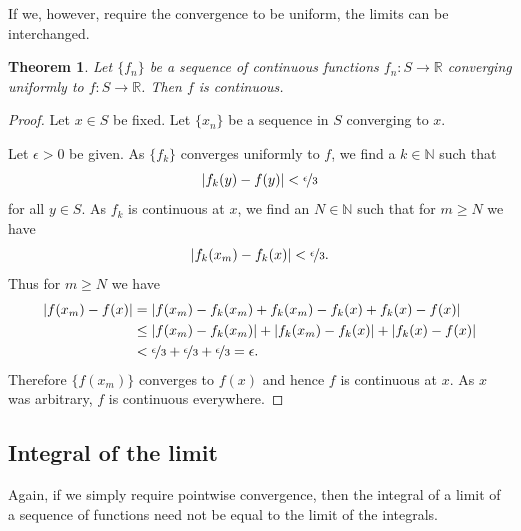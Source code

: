 \documentclass[12pt]{book}
\newcommand{\abs}[1]{\left\lvert {#1} \right\rvert}
\newcommand{\R}{{\mathbb{R}}}
\newcommand{\N}{{\mathbb{N}}}
\theoremstyle{plain}
\newtheorem{thm}{Theorem}[section]
\theoremstyle{remark}
\theoremstyle{definition}
\theoremstyle{exercise}
\theoremstyle{example}
\begin{document}
If we, however, require the convergence to be uniform, the limits can
be interchanged.

\begin{thm}
Let $\{ f_n \}$ be 
a sequence of continuous functions $f_n \colon S \to \R$ converging
uniformly to  $f \colon S \to \R$.  Then $f$ is continuous.
\end{thm}

\begin{proof}
Let $x \in S$ be fixed.  Let $\{ x_n \}$ be a sequence in $S$
converging to $x$.

Let $\epsilon > 0$ be given.
As $\{ f_k \}$ converges uniformly to $f$, we find a $k \in \N$ such that
\begin{equation*}
\abs{f_k(y)-f(y)} < \nicefrac{\epsilon}{3}
\end{equation*}
for all $y \in S$.  As $f_k$ is continuous at $x$,
we find an $N \in \N$ such that for $m \geq N$
we have 
\begin{equation*}
\abs{f_k(x_m)-f_k(x)} < \nicefrac{\epsilon}{3} .
\end{equation*}
Thus for
$m \geq N$ we have
\begin{equation*}
\begin{split}
\abs{f(x_m)-f(x)}
& =
\abs{f(x_m)-f_k(x_m)+f_k(x_m)-f_k(x)+f_k(x)-f(x)}
\\
& \leq
\abs{f(x_m)-f_k(x_m)}+
\abs{f_k(x_m)-f_k(x)}+
\abs{f_k(x)-f(x)}
\\
& <
\nicefrac{\epsilon}{3} +
\nicefrac{\epsilon}{3} +
\nicefrac{\epsilon}{3} = \epsilon .
\end{split}
\end{equation*}
Therefore $\{ f(x_m) \}$ converges to $f(x)$ and hence $f$ is continuous at
$x$.  As $x$ was arbitrary, $f$ is continuous everywhere.
\end{proof}

\subsection{Integral of the limit}

Again, if we simply require pointwise convergence, then the integral
of a limit of a sequence of functions need not be equal to the limit
of the integrals.
\end{document}
